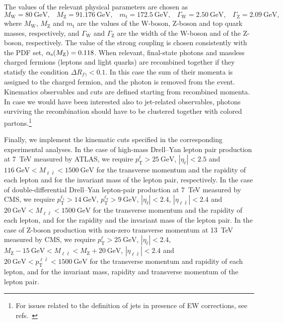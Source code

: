 The values of the relevant physical parameters are chosen as
\begin{equation}
M_\mathrm{W} = \SI{80}{\giga\electronvolt} \text{,} \quad 
M_\mathrm{Z} = \SI{91.176}{\giga\electronvolt} \text{,} \quad 
m_\mathrm{t} = \SI{172.5}{\giga\electronvolt} \text{,} \quad
\Gamma_\mathrm{W} = \SI{2.50}{\giga\electronvolt} \text{,} \quad
\Gamma_\mathrm{Z} = \SI{2.09}{\giga\electronvolt} \text{,} 
\label{eq:parameters}
\end{equation}
where $M_\mathrm{W}$, $M_\mathrm{Z}$ and $m_\mathrm{t}$ are the values of the W-boson, Z-boson and
top quark masses, respectively, and $\Gamma_\mathrm{W}$ and $\Gamma_\mathrm{Z}$ are the width of
the W-boson and of the Z-boson, respectively. The value of the strong
coupling is chosen consistently with the PDF set, $\alpha_\mathrm{s}(M_\mathrm{Z})=0.118$.
When relevant, final-state photons and massless charged fermions (leptons and light quarks) are recombined together 
if they statisfy the condition $\Delta R_{f \gamma} < 0.1$. In this case the
sum of their momenta is assigned to the charged fermion, and the photon is removed
from the event. Kinematics observables and cuts are defined starting from recombined momenta. In 
case we would have been interested also to jet-related observables,
photons surviving the recombination should have to be clustered together with colored 
partons.\footnote{For issues related to the definition of jets in presence of EW corrections,
    see refs.~\cite{Frederix:2016ost,Denner:2019zfp}} 
    
Finally, we implement the kinematic cuts specified in the corresponding
experimental analyses. In the case of high-mass Drell--Yan lepton pair
production at \SI{7}{\tera\electronvolt} measured by ATLAS, we require $p_\mathrm{T}^\ell>\SI{25}{\giga\electronvolt}$,
$|\eta_\ell|<2.5$ and $\SI{116}{\giga\electronvolt}<M_{\ell\bar\ell}<\SI{1500}{\giga\electronvolt}$ for the transverse
momentum and the rapidity of each lepton and for the invariant mass of the
lepton pair, respectively. In the case of double-differential Drell--Yan
lepton-pair production
at \SI{7}{\tera\electronvolt} measured by CMS, we require $p_\mathrm{T}^{\ell_1}>\SI{14}{\giga\electronvolt}$, $p_\mathrm{T}^{\ell_2}>\SI{9}{\giga\electronvolt}$,
$|\eta_\ell|<2.4$, $|\eta_{\ell\bar\ell}|<2.4$ and $\SI{20}{\giga\electronvolt}<M_{\ell\bar\ell}<\SI{1500}{\giga\electronvolt}$
for the transverse momentum and the rapidity of each lepton, and for the
rapidity and the invariant mass of the lepton pair. In the case of Z-boson
production with non-zero transverse momentum at \SI{13}{\tera\electronvolt} measured by CMS, we
require $p_\mathrm{T}^\ell>\SI{25}{\giga\electronvolt}$, $|\eta_\ell|<2.4$,
$M_\mathrm{Z}-\SI{15}{\giga\electronvolt}<M_{\ell\bar\ell}<M_\mathrm{Z}+\SI{20}{\giga\electronvolt}$,
$|\eta_{\ell\bar\ell}|<2.4$ and $\SI{20}{\giga\electronvolt}<p_\mathrm{T}^{\ell\bar\ell}<\SI{1500}{\giga\electronvolt}$ for the
transverse momentum and rapidity of each lepton, and for the invariant mass,
rapidity and transverse momentum of the lepton pair.

